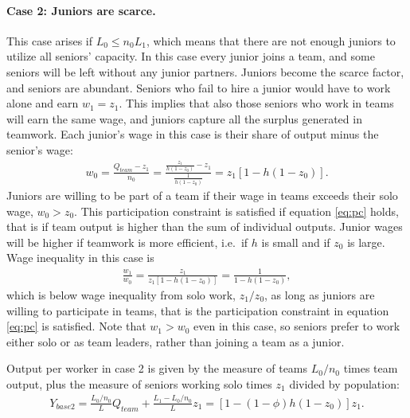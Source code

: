 \documentclass[12pt]{article}
\begin{document}
\paragraph{Case 2: Juniors are scarce.} This case arises if $L_0 \leq n_0 L_1$, which means that there are not enough juniors to utilize all seniors' capacity. In this case every junior joins a team, and some seniors will be left without any junior partners. Juniors become the scarce factor, and seniors are abundant. Seniors who fail to hire a
junior would have to work alone and earn $w_1=z_1$. This implies that also those seniors who work in teams will earn the same wage, and juniors capture all the surplus generated in teamwork. Each junior's wage in this case is their share of output minus the senior's wage:
\begin{align}\label{eq:w0}
w_0 = \frac{Q_{team}-z_1}{n_0}=\frac{\frac{z_1}{h(1-z_0)}-z_1}{\frac{1}{h(1-z_0)}}=z_1[1-h(1-z_0)].
\end{align}
Juniors are willing to be part of a team if their wage in teams exceeds their solo wage, $w_0>z_0$. This participation constraint is satisfied if equation \eqref{eq:pc} holds, that is if team output is higher than the sum of individual outputs. Junior wages will be higher if teamwork is more efficient, i.e.\ if $h$ is small and if $z_0$ is large. Wage inequality in this case is
\begin{align}\label{eq:ineq2}
\frac{w_1}{w_0} = \frac{z_1}{z_1[1-h(1-z_0)]}=\frac{1}{1-h(1-z_0)},
\end{align}
which is below wage inequality from solo work, $z_1/z_0$, as long as juniors are willing to participate in teams, that is the participation constraint in equation \eqref{eq:pc} is satisfied. Note that $w_1>w_0$ even in this case, so seniors prefer to work either solo or as team leaders, rather than joining a team as a junior.

Output per worker in case 2 is given by the measure of teams $L_0/n_0$ times team output, plus the measure of seniors working solo times $z_1$ divided by population:  
\begin{align}
Y_{base2} = \frac{L_0/n_0}{L}Q_{team}+\frac{L_1-L_0/n_0}{L}z_1=[1-(1-\phi)h(1-z_0)]z_1.
\end{align}

\end{document}
